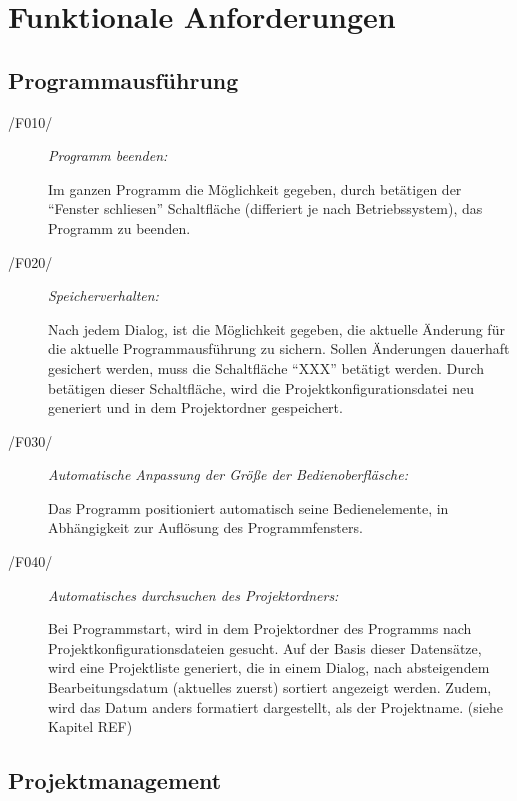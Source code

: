 \section{Funktionale Anforderungen}

\subsection{Programmausführung}
	
	\begin{description}
		
		\item[/F010/] \textit{Programm beenden:}\par Im ganzen Programm die Möglichkeit gegeben, durch betätigen der "`Fenster schliesen"' Schaltfläche (differiert je nach Betriebssystem), das Programm zu beenden.
		
		\item[/F020/] \textit{Speicherverhalten:}\par Nach jedem Dialog, ist die Möglichkeit gegeben, die aktuelle Änderung für die aktuelle Programmausführung zu sichern. Sollen Änderungen dauerhaft gesichert werden, muss die Schaltfläche "`XXX"' betätigt werden. Durch betätigen dieser Schaltfläche, wird die Projektkonfigurationsdatei neu generiert und in dem Projektordner gespeichert.
		
		\item[/F030/] \textit{Automatische Anpassung der Größe der Bedienoberfläsche:}\par Das Programm positioniert automatisch seine Bedienelemente, in Abhängigkeit zur Auflösung des Programmfensters.
		
		\item[/F040/] \textit{Automatisches durchsuchen des Projektordners:}\par Bei Programmstart, wird in dem Projektordner des Programms nach Projektkonfigurationsdateien gesucht. Auf der Basis dieser Datensätze, wird eine Projektliste generiert, die in einem Dialog, nach absteigendem Bearbeitungsdatum (aktuelles zuerst) sortiert angezeigt werden. Zudem, wird das Datum anders formatiert dargestellt, als der Projektname. (siehe Kapitel REF)
		
	\end{description}

\subsection{Projektmanagement}

